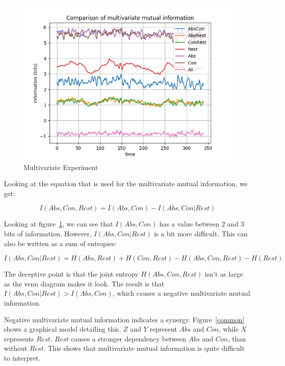 \begin{figure}[!htb]
\caption{Multivariate Experiment}
\label{mul-all-channel-1}
    \centering
    \includegraphics[width=\textwidth]{fig/mul-all-channel-1}
\end{figure}

Looking at the equation that is used for the multivariate mutual information, we get:

\begin{equation}
I(Abs, Con, Rest) = I(Abs, Con) - I(Abs, Con | Rest)
\end{equation}

Looking at figure~\ref{mul-all-channel-1}, we can see that $I(Abs, Con)$ has a value between 2 and 3 bits of information. However, $I(Abs, Con | Rest)$ is a bit more difficult. This can also be written as a sum of entropies:

\begin{equation}
I(Abs, Con | Rest) = H(Abs,Rest)+H(Con,Rest)-H(Abs, Con, Rest)-H(Rest)
\end{equation}

The deceptive point is that the joint entropy $H(Abs, Con, Rest)$ isn't as large as the venn diagram makes it look. The result is that $I(Abs, Con | Rest) > I(Abs, Con)$, which causes a negative multivariate mutual information. 

Negative multivariate mutual information indicates a synergy. Figure~\ref{common} shows a graphical model detailing this. $Z$ and $Y$ represent $Abs$ and $Con$, while $X$ represents $Rest$. $Rest$ causes a stronger dependency between $Abs$ and $Con$, than without $Rest$. This shows that multivariate mutual information is quite difficult to interpret.

